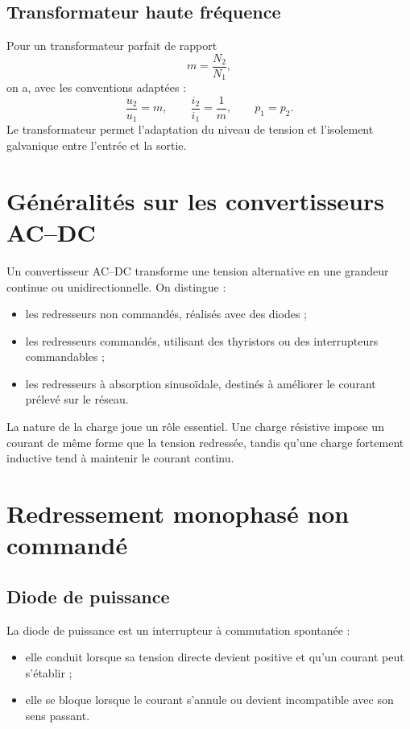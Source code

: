 \subsection{Transformateur haute fréquence}

Pour un transformateur parfait de rapport
\[
m=\frac{N_2}{N_1},
\]
on a, avec les conventions adaptées :
\[
\frac{u_2}{u_1}=m,
\qquad
\frac{i_2}{i_1}=\frac{1}{m},
\qquad
p_1=p_2.
\]
Le transformateur permet l'adaptation du niveau de tension et l'isolement galvanique entre l'entrée et la sortie.

\section{Généralités sur les convertisseurs AC--DC}

Un convertisseur AC--DC transforme une tension alternative en une grandeur continue ou unidirectionnelle. On distingue :
\begin{itemize}
\item les redresseurs non commandés, réalisés avec des diodes ;
\item les redresseurs commandés, utilisant des thyristors ou des interrupteurs commandables ;
\item les redresseurs à absorption sinusoïdale, destinés à améliorer le courant prélevé sur le réseau.
\end{itemize}

La nature de la charge joue un rôle essentiel. Une charge résistive impose un courant de même forme que la tension redressée, tandis qu'une charge fortement inductive tend à maintenir le courant continu.

\section{Redressement monophasé non commandé}

\subsection{Diode de puissance}

La diode de puissance est un interrupteur à commutation spontanée :
\begin{itemize}
\item elle conduit lorsque sa tension directe devient positive et qu'un courant peut s'établir ;
\item elle se bloque lorsque le courant s'annule ou devient incompatible avec son sens passant.
\end{itemize}

